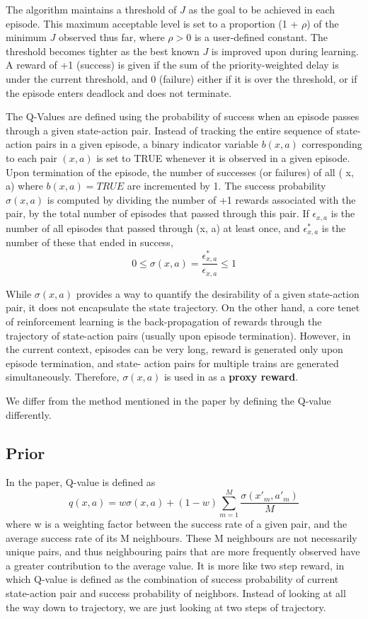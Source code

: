 The algorithm maintains a threshold of $J$ as the goal to be
achieved in each episode. This maximum acceptable level is
set to a proportion (1 + $\rho$) of the minimum $J$ observed thus
far, where $\rho > 0$ is a user-defined constant. The threshold
becomes tighter as the best known $J$ is improved upon during
learning. A reward of +1 (success) is given if the sum of the
priority-weighted delay is under the current threshold, and 0
(failure) either if it is over the threshold, or if the episode
enters deadlock and does not terminate.

\vspace{\baselineskip}
The Q-Values
are defined using the probability of success when an episode
passes through a given state-action pair. Instead of tracking
the entire sequence of state-action pairs in a given episode,
a binary indicator variable $b( x, a)$ corresponding to each pair
$( x, a)$ is set to TRUE whenever it is observed in a given
episode. Upon termination of the episode, the number of
successes (or failures) of all ( x, a) where $b( x, a) = TRUE$
are incremented by 1. The success probability $\sigma ( x, a)$ is
computed by dividing the number of +1 rewards associated
with the pair, by the total number of episodes that passed
through this pair. If $\epsilon_{x,a}$ is the number of all episodes that
passed through (x, a) at least once, and $\epsilon^{*}_{x,a}$ is the number of these 
that ended in success,
$$ 0 \leq \sigma(x,a) = \frac{\epsilon^{*}_{x,a}}{\epsilon_{x,a}} \leq 1$$

While $ \sigma ( x, a)$ provides a way to quantify the desirability
of a given state-action pair, it does not encapsulate the state
trajectory. On the other hand, a core tenet of reinforcement
learning is the back-propagation of rewards through the trajectory of state-action pairs (usually
upon episode termination).
However, in the current context, episodes can be very long,
reward is generated only upon episode termination, and state-
action pairs for multiple trains are generated simultaneously.
Therefore, $\sigma ( x, a)$ is used in as a \textbf{proxy reward}.

We differ from the method mentioned in the paper by defining the Q-value differently.

\subsection{Prior}
In the paper, Q-value is defined as 
$$ q(x,a) = w\sigma(x,a) + (1-w)\sum_{m=1}^{M}\frac{\sigma(x'_m, a'_m)}{M }  $$
where w is a weighting factor between the success rate of a given pair, 
and the average success rate of its M neighbours. These M neighbours are not necessarily unique pairs, and thus 
neighbouring pairs that are more frequently observed have a greater contribution to the average value. 
 It is more like two step reward, in which Q-value is defined as the combination of success 
probability of current state-action pair and success probability of neighbors. Instead of looking at 
all the way down to trajectory, we are just looking at two steps of trajectory.

